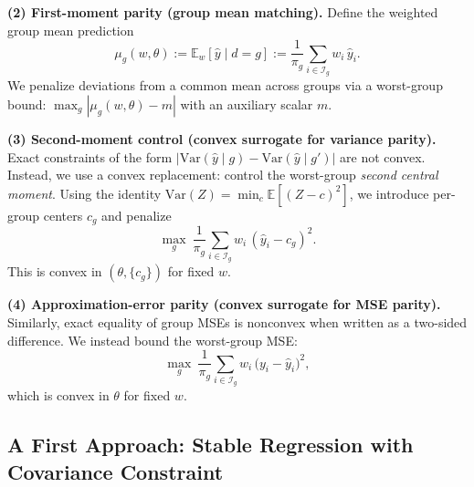 \documentclass{article}
\begin{document}
\vspace{2mm}
\noindent\textbf{(2) First-moment parity (group mean matching).}
Define the weighted group mean prediction
\[
\mu_g(w,\theta)
:= \mathbb{E}_w[\hat y\mid d=g]
:= \frac{1}{\pi_g}\sum_{i\in\mathcal{I}_g} w_i\,\hat y_i.
\]
We penalize deviations from a common mean across groups via a worst-group bound:
$\max_g |\mu_g(w,\theta)-m|$ with an auxiliary scalar $m$.

\vspace{2mm}
\noindent\textbf{(3) Second-moment control (convex surrogate for variance parity).}
Exact constraints of the form $|\mathrm{Var}(\hat y\mid g)-\mathrm{Var}(\hat y\mid g')|$ are not convex.
Instead, we use a convex replacement: control the worst-group \emph{second central moment}.
Using the identity $\mathrm{Var}(Z)=\min_c \mathbb{E}[(Z-c)^2]$, we introduce per-group centers $c_g$ and penalize
\[
\max_{g}\ \frac{1}{\pi_g}\sum_{i\in\mathcal{I}_g} w_i\,(\hat y_i - c_g)^2.
\]
This is convex in $(\theta,\{c_g\})$ for fixed $w$.

\vspace{2mm}
\noindent\textbf{(4) Approximation-error parity (convex surrogate for MSE parity).}
Similarly, exact equality of group MSEs is nonconvex when written as a two-sided difference.
We instead bound the worst-group MSE:
\[
\max_{g}\ \frac{1}{\pi_g}\sum_{i\in\mathcal{I}_g} w_i\,\big(y_i-\hat y_i\big)^2,
\]
which is convex in $\theta$ for fixed $w$.


\subsection{A First Approach: Stable Regression with Covariance Constraint}
\end{document}
